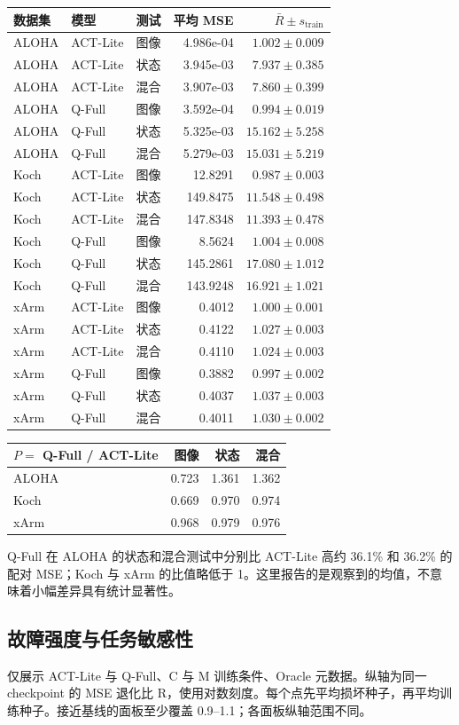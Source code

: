 \documentclass[11pt,a4paper,fontset=fandol]{ctexart}
\begin{document}
\begin{center}
\footnotesize
\begin{tabular}{lllrr}
\toprule
数据集 & 模型 & 测试 & 平均 MSE & $\bar R\pm s_{\mathrm{train}}$ \\
\midrule
ALOHA & ACT-Lite & 图像 & 4.986e-04 & $1.002\pm0.009$ \\
ALOHA & ACT-Lite & 状态 & 3.945e-03 & $7.937\pm0.385$ \\
ALOHA & ACT-Lite & 混合 & 3.907e-03 & $7.860\pm0.399$ \\
ALOHA & Q-Full & 图像 & 3.592e-04 & $0.994\pm0.019$ \\
ALOHA & Q-Full & 状态 & 5.325e-03 & $15.162\pm5.258$ \\
ALOHA & Q-Full & 混合 & 5.279e-03 & $15.031\pm5.219$ \\
Koch & ACT-Lite & 图像 & 12.8291 & $0.987\pm0.003$ \\
Koch & ACT-Lite & 状态 & 149.8475 & $11.548\pm0.498$ \\
Koch & ACT-Lite & 混合 & 147.8348 & $11.393\pm0.478$ \\
Koch & Q-Full & 图像 & 8.5624 & $1.004\pm0.008$ \\
Koch & Q-Full & 状态 & 145.2861 & $17.080\pm1.012$ \\
Koch & Q-Full & 混合 & 143.9248 & $16.921\pm1.021$ \\
xArm & ACT-Lite & 图像 & 0.4012 & $1.000\pm0.001$ \\
xArm & ACT-Lite & 状态 & 0.4122 & $1.027\pm0.003$ \\
xArm & ACT-Lite & 混合 & 0.4110 & $1.024\pm0.003$ \\
xArm & Q-Full & 图像 & 0.3882 & $0.997\pm0.002$ \\
xArm & Q-Full & 状态 & 0.4037 & $1.037\pm0.003$ \\
xArm & Q-Full & 混合 & 0.4011 & $1.030\pm0.002$ \\
\bottomrule
\end{tabular}
\end{center}
\begin{center}
\footnotesize
\begin{tabular}{lrrr}
\toprule
$P=$ Q-Full / ACT-Lite & 图像 & 状态 & 混合 \\
\midrule
ALOHA & 0.723 & 1.361 & 1.362 \\
Koch & 0.669 & 0.970 & 0.974 \\
xArm & 0.968 & 0.979 & 0.976 \\
\bottomrule
\end{tabular}
\end{center}
Q-Full 在 ALOHA 的状态和混合测试中分别比 ACT-Lite 高约 36.1\% 和 36.2\% 的配对 MSE；Koch 与 xArm 的比值略低于 1。这里报告的是观察到的均值，不意味着小幅差异具有统计显著性。
\clearpage\subsection{故障强度与任务敏感性}
仅展示 ACT-Lite 与 Q-Full、C 与 M 训练条件、Oracle 元数据。纵轴为同一 checkpoint 的 MSE 退化比 R，使用对数刻度。每个点先平均损坏种子，再平均训练种子。接近基线的面板至少覆盖 0.9--1.1；各面板纵轴范围不同。
\end{document}
